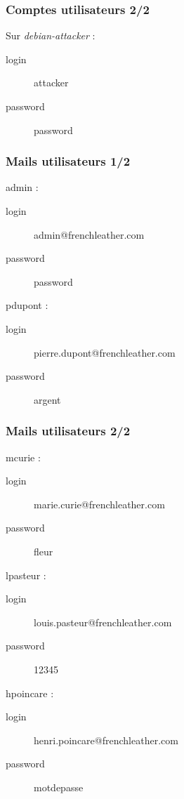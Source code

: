 \documentclass{beamer}
\begin{document}
		\begin{frame}
			\frametitle{Comptes utilisateurs 2/2}
			\begin{alertblock}{Sur \textit{debian-attacker} :}
				\begin{description}
					\item[login] attacker
					\item[password] password
				\end{description}
			\end{alertblock}
		\end{frame}
		\begin{frame}
			\frametitle{Mails utilisateurs 1/2}
			\begin{alertblock}{admin :}
				\begin{description}
					\item[login] admin@frenchleather.com
					\item[password] password
				\end{description}
			\end{alertblock}
			\begin{alertblock}{pdupont :}
				\begin{description}
					\item[login] pierre.dupont@frenchleather.com
					\item[password] argent
				\end{description}
			\end{alertblock}
		\end{frame}
		\begin{frame}
			\frametitle{Mails utilisateurs 2/2}
			\begin{alertblock}{mcurie :}
				\begin{description}
					\item[login] marie.curie@frenchleather.com
					\item[password] fleur
				\end{description}
			\end{alertblock}
			\begin{alertblock}{lpasteur :}
				\begin{description}
					\item[login] louis.pasteur@frenchleather.com
					\item[password] 12345
				\end{description}
			\end{alertblock}
			\begin{alertblock}{hpoincare :}
				\begin{description}
					\item[login] henri.poincare@frenchleather.com
					\item[password] motdepasse
				\end{description}
			\end{alertblock}
		\end{frame}
\end{document}
